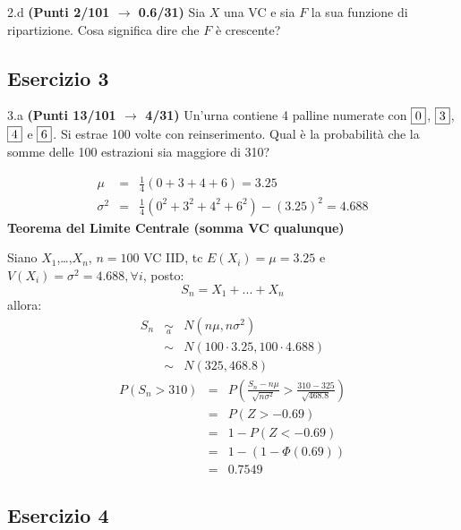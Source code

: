 \documentclass[
  11pt,
]{book}
\theoremstyle{mytheoremstyle}
\theoremstyle{mydefstyle}
\newenvironment{sol}
  {
  \begin{tcolorbox}[enhanced,breakable,arc=0.1mm,boxrule=1pt,colback=white,colframe=iblue,
  title=\bf \fontfamily{lmss}\selectfont \hspace{.5 cm} Soluzione,drop fuzzy shadow]

}{
\end{tcolorbox}
  }
\begin{document}
2.d \textbf{(Punti 2/101 \(\rightarrow\) 0.6/31)} Sia \(X\) una VC e sia \(F\) la sua funzione di ripartizione. Cosa significa dire che \(F\) è crescente?

\subsection{Esercizio 3}\label{esercizio-3-19}

3.a \textbf{(Punti 13/101 \(\rightarrow\) 4/31)} Un'urna contiene 4 palline numerate con \(\fbox{0}\), \(\fbox{3}\), \(\fbox{4}\) e \(\fbox{6}\). Si estrae 100 volte con reinserimento. Qual è la probabilità che la somme delle 100 estrazioni sia maggiore di 310?

\begin{sol}
\begin{eqnarray*}
 \mu &=& \frac 1{ 4 }(  0 + 3 + 4 + 6  )= 3.25 \\ 
 \sigma^2 &=& \frac 1{ 4 }(  0 ^2+ 3 ^2+ 4 ^2+ 6 ^2 )-( 3.25 )^2= 4.688 
\end{eqnarray*}
\textbf{Teorema del Limite Centrale (somma VC qualunque)}

Siano \(X_1\),\ldots,\(X_n\), \(n=100\) VC IID, tc \(E(X_i)=\mu=3.25\) e \(V(X_i)=\sigma^2=4.688,\forall i\), posto:
\[
      S_n = X_1 + ... + X_n
      \]
allora:\begin{eqnarray*}
  S_n & \mathop{\sim}\limits_{a}& N(n\mu,n\sigma^2) \\
     &\sim & N(100\cdot3.25,100\cdot4.688) \\
     &\sim & N(325,468.8) 
  \end{eqnarray*}\begin{eqnarray*}
      P( S_n   >   310 ) 
        &=& P\left(  \frac { S_n  -  n\mu }{ \sqrt{n\sigma^2} }  >  \frac { 310  -  325 }{\sqrt{ 468.8 }} \right)  \\
                 &=& P\left(  Z   >   -0.69 \right) \\    &=& 1-P(Z< -0.69 )\\ 
                 &=&  1-(1-\Phi( 0.69 )) \\ &=&  0.7549 
      \end{eqnarray*}

\end{sol}

\subsection{Esercizio 4}\label{esercizio-4-19}
\end{document}
